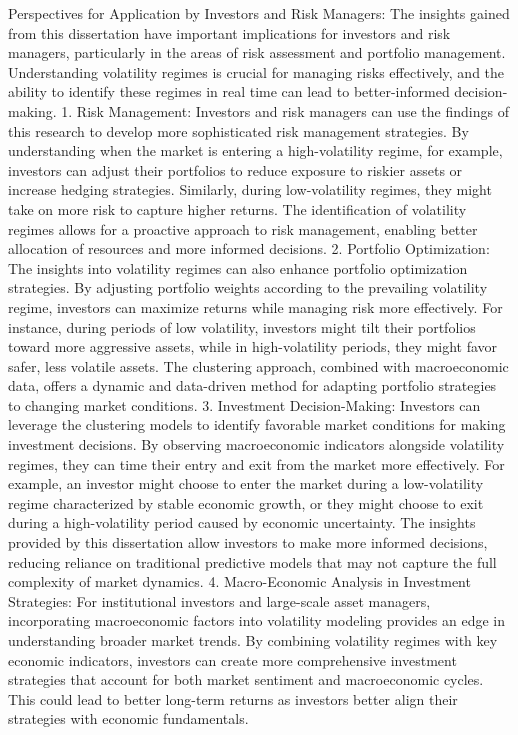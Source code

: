 Perspectives for Application by Investors and Risk Managers:
The insights gained from this dissertation have important implications for investors and risk managers, particularly in the areas of risk assessment and portfolio management. Understanding volatility regimes is crucial for managing risks effectively, and the ability to identify these regimes in real time can lead to better-informed decision-making.
1.	Risk Management: Investors and risk managers can use the findings of this research to develop more sophisticated risk management strategies. By understanding when the market is entering a high-volatility regime, for example, investors can adjust their portfolios to reduce exposure to riskier assets or increase hedging strategies. Similarly, during low-volatility regimes, they might take on more risk to capture higher returns. The identification of volatility regimes allows for a proactive approach to risk management, enabling better allocation of resources and more informed decisions.
2.	Portfolio Optimization: The insights into volatility regimes can also enhance portfolio optimization strategies. By adjusting portfolio weights according to the prevailing volatility regime, investors can maximize returns while managing risk more effectively. For instance, during periods of low volatility, investors might tilt their portfolios toward more aggressive assets, while in high-volatility periods, they might favor safer, less volatile assets. The clustering approach, combined with macroeconomic data, offers a dynamic and data-driven method for adapting portfolio strategies to changing market conditions.
3.	Investment Decision-Making: Investors can leverage the clustering models to identify favorable market conditions for making investment decisions. By observing macroeconomic indicators alongside volatility regimes, they can time their entry and exit from the market more effectively. For example, an investor might choose to enter the market during a low-volatility regime characterized by stable economic growth, or they might choose to exit during a high-volatility period caused by economic uncertainty. The insights provided by this dissertation allow investors to make more informed decisions, reducing reliance on traditional predictive models that may not capture the full complexity of market dynamics.
4.	Macro-Economic Analysis in Investment Strategies: For institutional investors and large-scale asset managers, incorporating macroeconomic factors into volatility modeling provides an edge in understanding broader market trends. By combining volatility regimes with key economic indicators, investors can create more comprehensive investment strategies that account for both market sentiment and macroeconomic cycles. This could lead to better long-term returns as investors better align their strategies with economic fundamentals.


